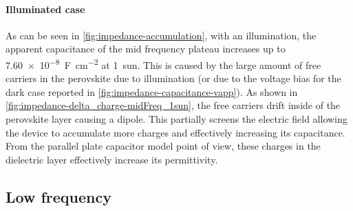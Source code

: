 
		\paragraph{Illuminated case}
		As can be seen in \cref{fig:impedance-accumulation}, with an illumination, the apparent capacitance of the mid frequency plateau increases up to \SI{7.60e-8}{\farad\per\square\cm} at \SI{1}{sun}.
		This is caused by the large amount of free carriers in the perovskite due to illumination (or due to the voltage bias for the dark case reported in \cref{fig:impedance-capacitance-vapp}).
		As shown in \cref{fig:impedance-delta_charge-midFreq_1sun}, the free carriers drift inside of the perovskite layer causing a dipole.
		This partially screens the electric field allowing the device to accumulate more charges and effectively increasing its capacitance.
		From the parallel plate capacitor model point of view, these charges in the dielectric layer effectively increase its permittivity.

		\begin{figure}%
		\end{figure}



	\subsection{Low frequency}

